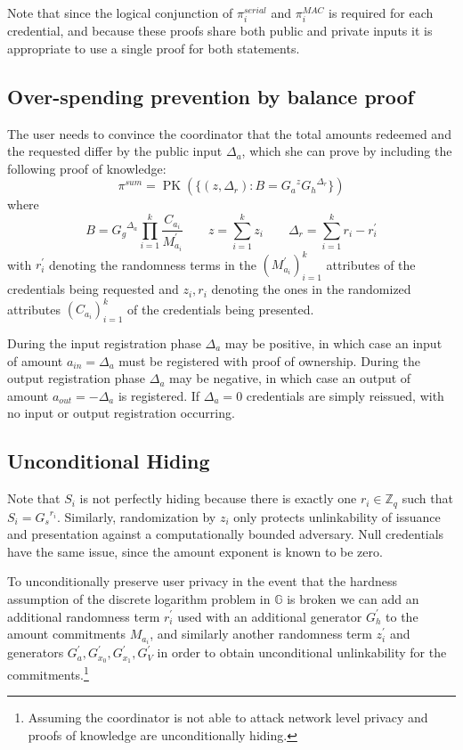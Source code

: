 \documentclass[a4paper]{article}
\begin{document}
Note that since the logical conjunction of $\pi_i^{\mathit{serial}}$ and $\pi_i^{\mathit{MAC}}$ is required for each credential, and because these proofs share both public and private inputs it is appropriate to use a single proof for both statements.

\subsection{Over-spending prevention by balance proof}\label{balance}

The user needs to convince the coordinator that the total amounts redeemed and the requested differ by the public input $\Delta_{a}$, which she can prove by including the following proof of knowledge:
\[ \pi^{\mathit{sum}} = \operatorname{PK}(\{ (z, \Delta_r) : B = {G_a}^{z} {G_h}^{\Delta_r} \})
\]
where
\[
B = {G_g}^{\Delta_a} \prod_{i=1}^k \frac{C_{a_i}}{M^{\prime}_{a_i}}
\qquad
z = \sum_{i=1}^k z_i
\qquad
\Delta_r = \sum_{i=1}^k r_i - r^{\prime}_i
\]
with $r^{\prime}_i$ denoting the randomness terms in the $(M^{\prime}_{a_i})_{i=1}^k$ attributes of the credentials being requested and $z_i, r_i$ denoting the ones in the randomized attributes $(C_{a_i})_{i=1}^k$ of the credentials being presented.

During the input registration phase $\Delta_{a}$ may be positive, in which case an input of amount $a_{\mathit{in}} = \Delta_{a}$ must be registered with proof of ownership. During the output registration phase $\Delta_{a}$ may be negative, in which case an output of amount $a_{\mathit{out}} = -\Delta_{a}$ is registered. If $\Delta_{a} = 0$ credentials are simply reissued, with no input or output registration occurring.

\subsection{Unconditional Hiding}

Note that $S_i$ is not perfectly hiding because there is exactly one $r_i \in \mathbb{Z}_q$ such that $S_i = {G_s}^{r_i}$. Similarly, randomization by $z_i$ only protects unlinkability of issuance and presentation against a computationally bounded adversary. Null credentials have the same issue, since the amount exponent is known to be zero.

To unconditionally preserve user privacy in the event that the hardness assumption of the discrete logarithm problem in $\mathbb{G}$ is broken we can add an additional randomness term $r_i^{\prime}$ used with an additional generator $G_h^{\prime}$ to the amount commitments $M_{a_i}$, and similarly another randomness term $z_i^{\prime}$ and generators $G_a^{\prime}, G_{x_0}^{\prime}, G_{x_1}^{\prime}, G_V^{\prime}$ in order to obtain unconditional unlinkability for the commitments.\footnote{Assuming the coordinator is not able to attack network level privacy and proofs of knowledge are unconditionally hiding.}
\end{document}
